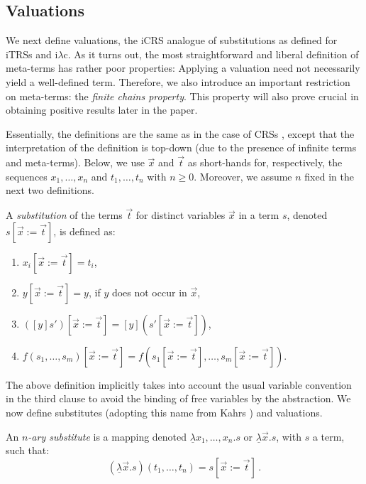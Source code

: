 \documentclass{LMCS}
\theoremstyle{definition}
\newcommand{\ulam}{\underline{\lambda}}
\newcommand{\iLC}{i$\lambda$c\xspace}
\begin{document}
\subsection{Valuations}

We next define valuations, the iCRS analogue of substitutions as defined for iTRSs and \iLC. As it turns out, the most straightforward and liberal definition of meta-terms has rather poor properties: Applying a valuation
need not necessarily yield a well-defined term. Therefore, we also introduce an important restriction on meta-terms: the \emph{finite chains property}. This property will also prove crucial in obtaining positive results later in the paper.

Essentially, the definitions are the same as in the case of CRSs \cite{KOR93,T03_R}, except that the interpretation of the definition is top-down (due to the presence of infinite terms and meta-terms). Below, we use $\vec{x}$ and $\vec{t}$ as short-hands for, respectively, the sequences $x_1, \ldots, x_n$ and $t_1, \ldots, t_n$ with $n \geq 0$. Moreover, we assume $n$ fixed in the next two definitions.
\begin{defi}
\label{defsubstitution}
A \emph{substitution} of the terms 
$\vec{t}$ for distinct variables 
$\vec{x}$ in a term $s$, denoted $s[\vec{x} := \vec{t}]$, is defined as:
\begin{enumerate}[(1)]
\item
$x_i[\vec{x} := \vec{t}] = t_i$,
\item
$y[\vec{x} := \vec{t}] = y$, if $y$ does not occur in $\vec{x}$,
\item
$([y]s')[\vec{x} := \vec{t}] = [y](s'[\vec{x} := \vec{t}])$,
\item
$f(s_1, \ldots, s_m)[\vec{x} := \vec{t}] = f(s_1[\vec{x} := \vec{t}],
\ldots, s_m[\vec{x} := \vec{t}])$.
\end{enumerate}
The above definition implicitly takes into account the usual variable
convention \cite{B85} in the third clause to avoid the binding of free
variables by the abstraction. We now define substitutes (adopting this
name from Kahrs \cite{K93}) and valuations.
\end{defi}

\begin{defi}
\label{defsubstitute}
An \emph{$n$-ary substitute} is a mapping denoted $\ulam x_1, \ldots, x_n . s$ or $\ulam \vec{x} . s$, with $s$ a term, such that:
\begin{equation}
\label{pbetaeq}
(\ulam \vec{x} . s)(t_1, \ldots, t_n) = s[\vec{x} := \vec{t}] \, .
\end{equation}
\end{defi}
\end{document}
